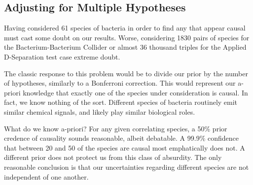 \documentclass[letterpaper]{article}
\begin{document}
\subsection{Adjusting for Multiple Hypotheses}

Having considered 61 species of bacteria in order to find any that appear causal must cast some doubt on our results.  Worse, considering 1830 pairs of species for the Bacterium-Bacterium Collider or almost 36 thousand triples for the Applied D-Separation test case extreme doubt.

The classic response to this problem would be to divide our prior by the number of hypotheses, similarly to a Bonferroni correction.  This would represent our a-priori knowledge that exactly one of the species under consideration is causal.  In fact, we know nothing of the sort.  Different species of bacteria routinely emit similar chemical signals, and likely play similar biological roles.

What do we know a-priori?  For any given correlating species, a 50\% prior credence of causality sounds reasonable, albeit debatable.  A 99.9\% confidence that between 20 and 50 of the species are causal most emphatically does not.  A different prior does not protect us from this class of absurdity.  The only reasonable conclusion is that our uncertainties regarding different species are not independent of one another.

\printbibliography
\end{document}
